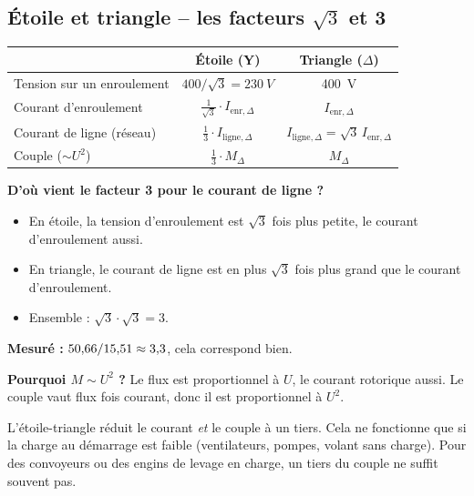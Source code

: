 \documentclass[11pt,a4paper]{article}
\begin{document}
\subsection{Étoile et triangle -- les facteurs \texorpdfstring{$\sqrt3$}{racine de 3} et 3}
\begin{center}
\begin{tabular}{@{}lcc@{}}
\toprule
& Étoile (Y) & Triangle ($\Delta$)\\
\midrule
Tension sur un enroulement & $400/\sqrt3 = \SI{230}{V}$ & \SI{400}{V}\\
Courant d'enroulement & $\frac{1}{\sqrt3}\cdot I_{\mathrm{enr},\Delta}$ & $I_{\mathrm{enr},\Delta}$\\
Courant de ligne (réseau) & $\frac13\cdot I_{\mathrm{ligne},\Delta}$ & $I_{\mathrm{ligne},\Delta} = \sqrt3\,I_{\mathrm{enr},\Delta}$\\
Couple ($\sim U^2$) & $\frac13\cdot M_\Delta$ & $M_\Delta$\\
\bottomrule
\end{tabular}
\end{center}
\textbf{D'où vient le facteur 3 pour le courant de ligne ?}
\begin{itemize}
\item En étoile, la tension d'enroulement est $\sqrt3$ fois plus petite, le courant d'enroulement aussi.
\item En triangle, le courant de ligne est en plus $\sqrt3$ fois plus grand que le courant d'enroulement.
\item Ensemble : $\sqrt3\cdot\sqrt3 = 3$.
\end{itemize}
\textbf{Mesuré :} $50{,}66/15{,}51\approx3{,}3$, cela correspond bien.

\textbf{Pourquoi $M\sim U^2$ ?} Le flux est proportionnel à $U$, le courant rotorique aussi.
Le couple vaut flux fois courant, donc il est proportionnel à $U^2$.

\begin{merke}
L'étoile-triangle réduit le courant \emph{et} le couple à un tiers. Cela ne fonctionne que si la
charge au démarrage est faible (ventilateurs, pompes, volant sans charge). Pour des convoyeurs
ou des engins de levage en charge, un tiers du couple ne suffit souvent pas.
\end{merke}
\end{document}
